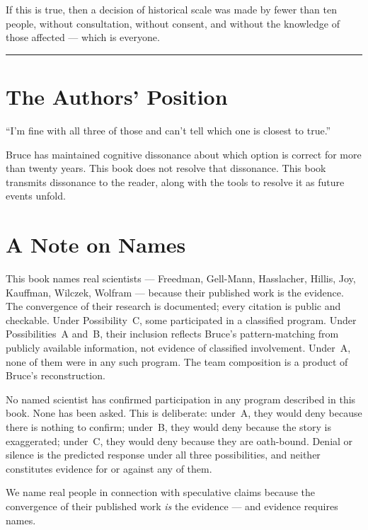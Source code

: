 If this is true, then a decision of historical scale was made by fewer than ten people, without consultation, without consent, and without the knowledge of those affected --- which is everyone.

\vspace{1cm}
\noindent\rule{0.5\textwidth}{0.5pt}
\vspace{0.5cm}

\section*{The Authors' Position}
\label{spine:authors-position}

``I'm fine with all three of those and can't tell which one is closest to true.''

Bruce has maintained cognitive dissonance about which option is correct for more than twenty years. This book does not resolve that dissonance. This book transmits dissonance to the reader, along with the tools to resolve it as future events unfold.

\section*{A Note on Names}
\label{spine:note-on-names}

This book names real scientists --- Freedman, Gell-Mann, Hasslacher, Hillis, Joy, Kauffman, Wilczek, Wolfram --- because their published work is the evidence. The convergence of their research is documented; every citation is public and checkable. Under Possibility~C, some participated in a classified program. Under Possibilities~A and~B, their inclusion reflects Bruce's pattern-matching from publicly available information, not evidence of classified involvement. Under~A, none of them were in any such program. The team composition is a product of Bruce's reconstruction.

No named scientist has confirmed participation in any program described in this book. None has been asked. This is deliberate: under~A, they would deny because there is nothing to confirm; under~B, they would deny because the story is exaggerated; under~C, they would deny because they are oath-bound. Denial or silence is the predicted response under all three possibilities, and neither constitutes evidence for or against any of them.

We name real people in connection with speculative claims because the convergence of their published work \textit{is} the evidence --- and evidence requires names.

